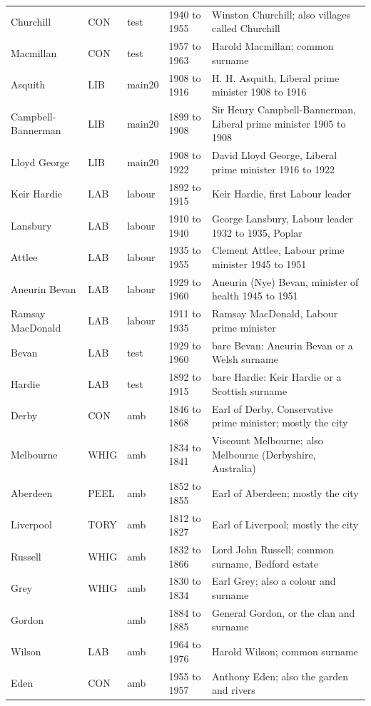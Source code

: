 \documentclass[11pt,a4paper]{article}
\begin{document}
\begin{small}
\begin{longtable}{llllp{7.4cm}}
Churchill & CON & test & 1940 to 1955 & Winston Churchill; also villages called Churchill\\
Macmillan & CON & test & 1957 to 1963 & Harold Macmillan; common surname\\
Asquith & LIB & main20 & 1908 to 1916 & H. H. Asquith, Liberal prime minister 1908 to 1916\\
Campbell-Bannerman & LIB & main20 & 1899 to 1908 & Sir Henry Campbell-Bannerman, Liberal prime minister 1905 to 1908\\
Lloyd George & LIB & main20 & 1908 to 1922 & David Lloyd George, Liberal prime minister 1916 to 1922\\
Keir Hardie & LAB & labour & 1892 to 1915 & Keir Hardie, first Labour leader\\
Lansbury & LAB & labour & 1910 to 1940 & George Lansbury, Labour leader 1932 to 1935, Poplar\\
Attlee & LAB & labour & 1935 to 1955 & Clement Attlee, Labour prime minister 1945 to 1951\\
Aneurin Bevan & LAB & labour & 1929 to 1960 & Aneurin (Nye) Bevan, minister of health 1945 to 1951\\
Ramsay MacDonald & LAB & labour & 1911 to 1935 & Ramsay MacDonald, Labour prime minister\\
Bevan & LAB & test & 1929 to 1960 & bare Bevan: Aneurin Bevan or a Welsh surname\\
Hardie & LAB & test & 1892 to 1915 & bare Hardie: Keir Hardie or a Scottish surname\\
Derby & CON & amb & 1846 to 1868 & Earl of Derby, Conservative prime minister; mostly the city\\
Melbourne & WHIG & amb & 1834 to 1841 & Viscount Melbourne; also Melbourne (Derbyshire, Australia)\\
Aberdeen & PEEL & amb & 1852 to 1855 & Earl of Aberdeen; mostly the city\\
Liverpool & TORY & amb & 1812 to 1827 & Earl of Liverpool; mostly the city\\
Russell & WHIG & amb & 1832 to 1866 & Lord John Russell; common surname, Bedford estate\\
Grey & WHIG & amb & 1830 to 1834 & Earl Grey; also a colour and surname\\
Gordon &  & amb & 1884 to 1885 & General Gordon, or the clan and surname\\
Wilson & LAB & amb & 1964 to 1976 & Harold Wilson; common surname\\
Eden & CON & amb & 1955 to 1957 & Anthony Eden; also the garden and rivers\\

\end{longtable}
\end{small}
\end{document}
